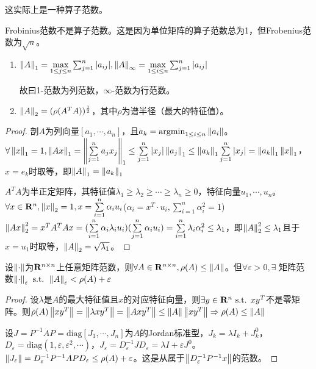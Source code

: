 \documentclass{ctexart}
\begin{document}
这实际上是一种算子范数。

Frobinius范数不是算子范数。这是因为单位矩阵的算子范数总为1，但Frobenius范数为$\sqrt{n}$。

\begin{Eg}
\begin{enumerate}
\item$\left\|A\right\|_1=\max\limits_{1\leq j\leq n}\sum_{j=1}^n|a_{ij}|,\left\|A\right\|_\infty=\max\limits_{1\leq i\leq n}\sum_{j=1}^n|a_{ij}|$

故曰1-范数为列范数，$\infty$-范数为行范数。
\item $\left\|A\right\|_2=(\rho(A^TA))^{\frac 1 2}$，其中$\rho$为谱半径（最大的特征值）。
\end{enumerate}
\end{Eg}

\begin{proof}
剖$A$为列向量$[a_1,\cdots,a_n]$，且$a_k=\mathrm{argmin}_{1\leq i\leq n}\left\|a_i\right\|$。$\forall \left\|x\right\|_1=1, \left\|Ax\right\|_1=\left\|\sum\limits_{j=1}^n a_jx_j\right\|_1\leq \sum\limits_{j=1}^n |x_j|\left\|a_j\right\|_1\leq\left\|a_k\right\|_1\sum\limits_{j=1}^n|x_j|=\left\|a_k\right\|_1\left\|x\right\|_1$，$x=e_k$时取等，即$\left\|A\right\|_1=\left\|a_k\right\|_1$

$A^TA$为半正定矩阵，其特征值$\lambda_1\geq \lambda_2\geq\cdots\geq \lambda_n\geq 0$，特征向量$u_1,\cdots,u_n$。$\forall x\in \mathbf{R}^n, \left\|x\right\|_2=1, x=\sum\limits_{i=1}^n \alpha_iu_i$($\alpha_i=x^T\cdot u_i,\sum\limits_{i=1}^n \alpha_i^2=1$)
$\left\|Ax\right\|_2^2=x^TA^TAx=(\sum\limits_{i=1}^n \alpha_i\lambda_iu_i)(\sum\limits_{j=1}^n\alpha_iu_i)=\sum\limits_{i=1}^n\lambda_i\alpha_i^2\leq \lambda_1$，即$\left\|A\right\|_2^2\leq\lambda_1$且于$x=u_1$时取等，$\left\|A\right\|_2=\sqrt{\lambda_1}$。

\end{proof}

\begin{Thm}
设$\left\|\cdot\right\|$为$\mathbf{R}^{n\times n}$上任意矩阵范数，则$\forall A\in \mathbf{R}^{n\times n},\rho(A)\leq \left\|A\right\|$。但$\forall \varepsilon>0,\exists$ 矩阵范数$\left\|\cdot\right\|_{\varepsilon}\text{ s.t. }\left\|A\right\|_\varepsilon<\rho(A)+\varepsilon$
\end{Thm}

\begin{proof}
设$\lambda$是$A$的最大特征值且$x$的对应特征向量，则$\exists y\in \mathbf{R}^n\text{ s.t. } xy^T$不是零矩阵。则$\rho(A)\left\|xy^T\right\|=\left\|\lambda  xy^T\right\|=\left\|Axy^T\right\|\leq \left\|A\right\|\left\|xy^T\right\|\Rightarrow \rho(A)\leq \left\|A\right\|$

设$J=P^{-1}AP=\mathrm{diag}[J_1,\cdots,J_n]$为$A$的Jordan标准型，$J_k=\lambda I_k+J^0_k$，$D_\varepsilon=\mathrm{diag}(1,\varepsilon,\varepsilon^2,\cdots)$，$J_\varepsilon=D^{-1}_\varepsilon JD_\varepsilon=\lambda I+\varepsilon J^0$。$\left\|J_\varepsilon\right\|=D^{-1}_\varepsilon P^{-1}APD_{\varepsilon}\leq \rho(A)+\varepsilon$。这是从属于$\left\|D^{-1}_\varepsilon P^{-1}x\right\|$的范数。
\end{proof}
\end{document}
